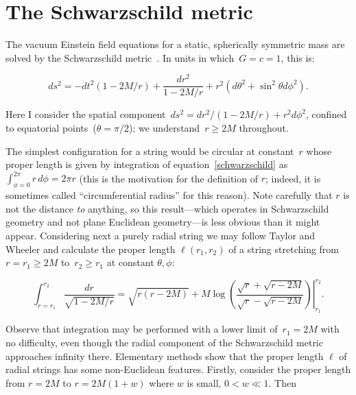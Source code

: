 \documentclass{ws-tpe}
\begin{document}
\section{The Schwarzschild metric}

The vacuum Einstein field equations for a static, spherically
symmetric mass are solved by the Schwarzschild
metric~\cite{schwarzschild1916}.  In units in which~$G=c=1$, this is:

\begin{equation}\label{schwarzschild}
ds^2= -dt^2\left(1-2M/r\right) +\frac{dr^2}{1-2M/r} + r^2\left(d\theta^2 + \sin^2\theta d\phi^2\right).
\end{equation}

\noindent Here I consider the spatial component~$ds^2=
dr^2/\left(1-2M/r\right) + r^2d\phi^2$, confined to equatorial
points~($\theta=\pi/2$); we understand~$r\geqslant 2M$ throughout.

The simplest configuration for a string would be circular at
constant~$r$ whose proper length is given by integration of
equation~\ref{schwarzschild} as~$\int_{\phi=0}^{2\pi}r\,d\phi=2\pi r$
(this is the motivation for the definition of $r$; indeed, it is
sometimes called ``circumferential radius'' for this reason).  Note
carefully that $r$ is not the distance {\em to} anything, so this
result---which operates in Schwarzschild geometry and not plane
Euclidean geometry---is less obvious than it might appear.
Considering next a purely radial string we may follow Taylor and
Wheeler \cite{taylor2000} and calculate the proper length
$\ell\left(r_1,r_2\right)$ of a string stretching from~$r=r_1\geqslant
2M$ to~$r_2\geqslant r_1$ at constant $\theta,\phi$:



\begin{equation}\label{radial_string_length}
  \int_{r=r_1}^{r_2}\frac{dr}{\sqrt{1-2M/r}}=
  \left.
  \sqrt{r(r-2M)} +M\log\left(
  \frac{\sqrt{r}+\sqrt{r-2M}}{\sqrt{r}-\sqrt{r-2M}}\right)
  \right|_{r_1}^{r_2}.
  \end{equation}

Observe that integration may be performed with a lower limit
of~$r_1=2M$ with no difficulty, even though the radial component of
the Schwarzschild metric approaches infinity there.  Elementary
methods show that the proper length $\ell$ of radial strings has some
non-Euclidean features.  Firstly, consider the proper length from
$r=2M$ to $r=2M(1+w)$ where $w$ is small, $0<w\ll 1$.  Then
\end{document}

